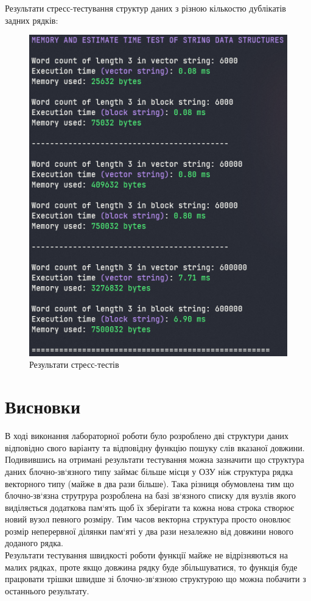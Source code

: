 \clearpage
Результати стресс-тестування структур даних з різною кількостю дублікатів задних рядків:

\begin{figure}[h!]
  \centering
  \includegraphics[width=15cm]{reports/algos/lab6/assets/2.png}
  \caption{Результати стресс-тестів}
\end{figure}

\clearpage
\section{Висновки}
  В ході виконання лабораторної роботи було розроблено дві структури даних відповідно свого
варіанту та відповідну функцію пошуку слів вказаної довжини.\\

  Подивившись на отримані результати тестування можна зазначити що структура даних 
блочно-зв`язного типу займає більше місця у ОЗУ ніж структура рядка векторного типу (майже в два рази більше). Така різниця обумовлена тим що  блочно-зв`язна струтрура розроблена на базі зв`язного списку для вузлів якого виділяється додаткова пам`ять щоб їх зберігати та кожна нова строка створює новий вузол певного розміру. Тим часов векторна структура просто оновлює розмір неперервної ділянки пам`яті у два рази незалежно від довжини нового доданого рядка.\\

  Результати тестування швидкості роботи функції майже не відрізняються на малих рядках, проте
якщо довжина рядку буде збільшуватися, то функція буде працювати трішки швидше зі блочно-зв`язною структурою що можна побачити з останнього результату.




